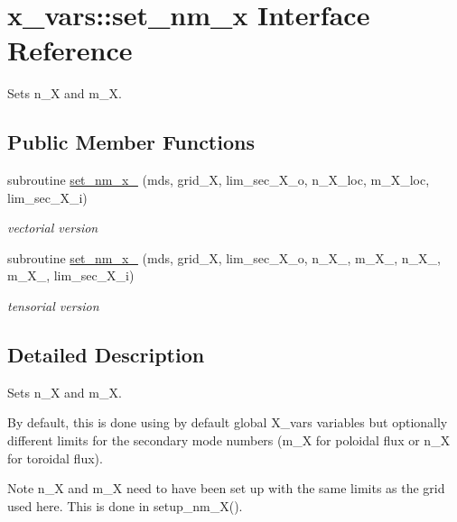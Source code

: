 \hypertarget{interfacex__vars_1_1set__nm__x}{}\section{x\+\_\+vars\+:\+:set\+\_\+nm\+\_\+x Interface Reference}
\label{interfacex__vars_1_1set__nm__x}


Sets {\ttfamily n\+\_\+X} and {\ttfamily m\+\_\+X}.  


\subsection*{Public Member Functions}
\begin{DoxyCompactItemize}
\item 
subroutine \hyperlink{interfacex__vars_1_1set__nm__x_aad881ea6586866ad8131cbc8a6435b20}{set\+\_\+nm\+\_\+x\+\_} (mds, grid\+\_\+X, lim\+\_\+sec\+\_\+\+X\+\_\+o, n\+\_\+\+X\+\_\+loc, m\+\_\+\+X\+\_\+loc, lim\+\_\+sec\+\_\+\+X\+\_\+i)
\begin{DoxyCompactList}\small\item\em vectorial version \end{DoxyCompactList}\item 
subroutine \hyperlink{interfacex__vars_1_1set__nm__x_a4ad3e1dee8f68fa4b506fc3f5ac8cf49}{set\+\_\+nm\+\_\+x\+\_} (mds, grid\+\_\+X, lim\+\_\+sec\+\_\+\+X\+\_\+o, n\+\_\+\+X\+\_, m\+\_\+\+X\+\_, n\+\_\+\+X\+\_, m\+\_\+\+X\+\_, lim\+\_\+sec\+\_\+\+X\+\_\+i)
\begin{DoxyCompactList}\small\item\em tensorial version \end{DoxyCompactList}\end{DoxyCompactItemize}


\subsection{Detailed Description}
Sets {\ttfamily n\+\_\+X} and {\ttfamily m\+\_\+X}. 

By default, this is done using by default global {\ttfamily X\+\_\+vars} variables but optionally different limits for the secondary mode numbers ({\ttfamily m\+\_\+X} for poloidal flux or {\ttfamily n\+\_\+X} for toroidal flux).

\begin{DoxyNote}{Note}
{\ttfamily n\+\_\+X} and {\ttfamily m\+\_\+X} need to have been set up with the same limits as the grid used here. This is done in setup\+\_\+nm\+\_\+\+X(). 
\end{DoxyNote}


